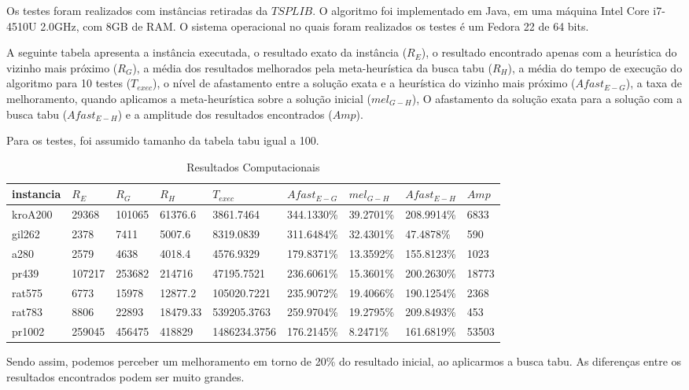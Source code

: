 Os testes foram realizados com instâncias retiradas da $TSPLIB$\cite{TSPLIB}. O algoritmo foi implementado em Java, em uma máquina Intel Core i7-4510U 2.0GHz, com 8GB de RAM. O sistema operacional no quais foram realizados os testes é um Fedora 22 de 64 bits.

A seguinte tabela apresenta a instância executada, o resultado exato da instância ($R_{E}$), o resultado encontrado apenas com a heurística do vizinho mais próximo ($R_{G}$), a média dos resultados melhorados pela meta-heurística da busca tabu ($R_{H}$), a média do tempo de execução do algoritmo para 10 testes ($T_{exec}$), o nível de afastamento entre a solução exata e a heurística do vizinho mais próximo ($Afast_{E-G}$), a taxa de melhoramento, quando aplicamos a meta-heurística sobre a solução inicial ($mel_{G-H}$), O afastamento da solução exata para a solução com a busca tabu ($Afast_{E-H}$) e a amplitude dos resultados encontrados ($Amp$).

Para os testes, foi assumido tamanho da tabela tabu igual a 100.
\begin{table}[h]
	\hspace{-2cm}
	\begin{tabular}{ | l | l | l | l | l | l | l | l | l | }
		\hline
		instancia & $R_{E}$ & $R_G$ & $R_H$ & $T_{exec}$ & $Afast_{E-G}$ & $mel_{G-H}$ & $Afast_{E-H}$ & $Amp$ \\ \hline
		kroA200 & 29368 & 101065 & 61376.6 & 3861.7464 & 344.1330\% & 39.2701\% & 208.9914\% & 6833  \\ \hline
		gil262 & 2378 & 7411 & 5007.6 & 8319.0839 & 311.6484\% & 32.4301\% & 47.4878\% & 590  \\ \hline
		a280 & 2579 & 4638 & 4018.4 & 4576.9329 & 179.8371\% & 13.3592\% & 155.8123\% & 1023  \\ \hline
		pr439 & 107217 & 253682 & 214716 & 47195.7521 & 236.6061\% & 15.3601\% & 200.2630\% & 18773 \\ \hline
		rat575 & 6773 & 15978 & 12877.2 & 105020.7221 & 235.9072\% & 19.4066\% & 190.1254\% & 2368  \\ \hline
		rat783 & 8806 & 22893 & 18479.33 & 539205.3763 & 259.9704\% & 19.2795\% & 209.8493\% & 453  \\ \hline
		pr1002 & 259045 & 456475 & 418829 & 1486234.3756 & 176.2145\% & 8.2471\% & 161.6819\% & 53503  \\ \hline
	\end{tabular}
	
	\caption{Resultados Computacionais}
\end{table}

Sendo assim, podemos perceber um melhoramento em torno de 20\% do resultado inicial, ao aplicarmos a busca tabu. As diferenças entre os resultados encontrados podem ser muito grandes.